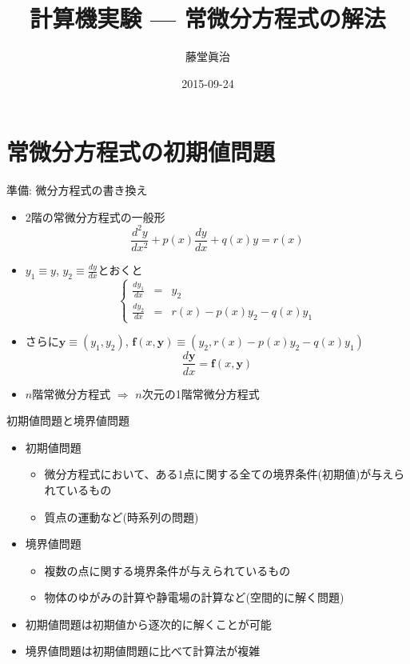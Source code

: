 \documentclass[dvipdfmx]{beamer}
\title{計算機実験 --- 常微分方程式の解法}
\author{藤堂眞治}
\date{2015-09-24}
\begin{document}

\begin{frame}
  \titlepage
  \tableofcontents
\end{frame}

\section{常微分方程式の初期値問題}

\begin{frame}[t,fragile]{準備: 微分方程式の書き換え}
  \begin{itemize}
  \item 2階の常微分方程式の一般形
    \[
    \frac{d^2y}{dx^2} + p(x)\frac{dy}{dx} + q(x)y = r(x)
    \]
  \item $y_1 \equiv y$, $y_2 \equiv \frac{dy}{dx}$とおくと
    \[
    \left\{
    \begin{array}{ccl}
      \frac{dy_1}{dx} & = & y_2 \\
      \frac{dy_2}{dx} & = & r(x) - p(x) y_2 - q(x) y_1
    \end{array}
    \right.
    \]
  \item さらに$\bm{y}\equiv(y_1, y_2)$, $\bm{f}(x, \bm{y})\equiv \left(y_2, r(x)-p(x)y_2 - q(x)y_1\right)$
    \[
    \frac{d\bm{y}}{dx} = \bm{f}(x, \bm{y})
    \]
  \item $n$階常微分方程式 $\Rightarrow$ $n$次元の1階常微分方程式
  \end{itemize}
\end{frame}

\begin{frame}[t,fragile]{初期値問題と境界値問題}
  \begin{itemize}
    \setlength{\itemsep}{1em}
  \item 初期値問題
    \begin{itemize}
    \item 微分方程式において、ある1点に関する全ての境界条件(初期値)が与えられているもの
    \item 質点の運動など(時系列の問題)
  \end{itemize}
  \item 境界値問題
    \begin{itemize}
    \item 複数の点に関する境界条件が与えられているもの
    \item 物体のゆがみの計算や静電場の計算など(空間的に解く問題)
  \end{itemize}
  \item 初期値問題は初期値から逐次的に解くことが可能
  \item 境界値問題は初期値問題に比べて計算法が複雑
  \end{itemize}
\end{frame}
\end{document}
